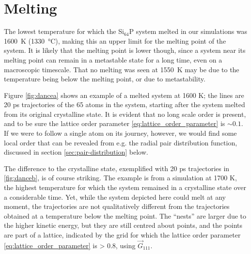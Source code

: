 \documentclass[11pt,bibliography=totoc,index=totoc]{scrbook}   %
\begin{document}
%
\section{Melting}
%


The lowest temperature for which the Si$_{64}$P system melted in our simulations was \SI{1600}{\kelvin} (\SI{1330}{\celsius}), making this an upper limit for the melting point of the system. 
It is likely that the melting point is lower though, since a system near its melting point can remain in a metastable state for a long time, even on a macroscopic timescale.
That no melting was seen at \SI{1550}{\kelvin} may be due to the temperature being below the melting point, or due to metastability.

Figure \ref{fig:dancea} shows an example of a melted system at 1600 K; the lines are 20 ps trajectories of the 65 atoms in the system, starting after the system melted from its original crystalline state. 
It is evident that no long scale order is present, and to be sure the lattice order parameter \eqref{eq:lattice_order_parameter} is $\sim 0.1$. If we were to follow a single atom on its journey, however, we would find some local order that can be revealed from e.g. the radial pair distribution function, discussed in section \ref{sec:pair-distribution} below.

The difference to the crystalline state, exemplified with 20 ps trajectories in \ref{fig:danceb}, is of course striking. 
The example is from a simulation at 1700 K, the highest temperature for which the system remained in a crystalline state over a considerable time.
Yet, while the system depicted here could melt at any moment, the trajectories are not qualitatively different from the trajectories obtained at a temperature below the melting point. The ``nests'' are larger due to the higher kinetic energy, but they are still centred about points, and the points are part of a lattice, indicated by the grid for which the lattice order parameter \eqref{eq:lattice_order_parameter} is > 0.8, using $\vec{G}_{111}$. 
\end{document}
